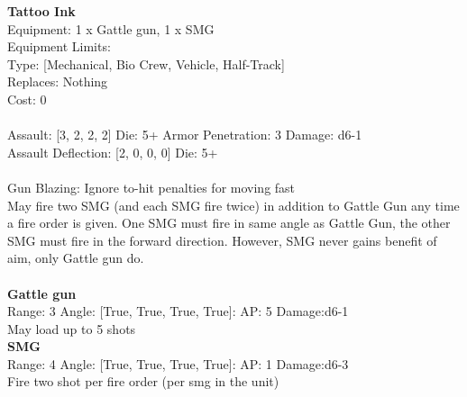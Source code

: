 {\bf Tattoo Ink } \\
Equipment: 1 x Gattle gun, 1 x SMG \\
Equipment Limits:  \\
Type: [Mechanical, Bio Crew, Vehicle, Half-Track] \\
Replaces: Nothing \\
Cost: 0\\
\ \\
Assault: [3, 2, 2, 2] Die: 5+ Armor Penetration: 3 Damage: d6-1 \\
Assault Deflection: [2, 0, 0, 0] Die: 5+\\
\indent  
\ \\
Gun Blazing: Ignore to-hit penalties for moving fast\\ 
May fire two SMG (and each SMG fire twice) in addition to Gattle Gun any time a fire order is given. One SMG must fire in same angle as Gattle Gun, the other SMG must fire in the forward direction. However, SMG never gains benefit of aim, only Gattle gun do.\\ 

\ \\
{\bf Gattle gun } \\



Range: 3  Angle: [True, True, True, True]: AP: 5 Damage:d6-1 \\
May load up to 5 shots\\ 




{\bf SMG } \\



Range: 4  Angle: [True, True, True, True]: AP: 1 Damage:d6-3 \\
Fire two shot per fire order (per smg in the unit)\\ 




 
\ \\



